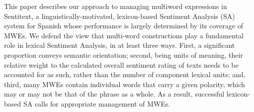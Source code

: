 This paper describes our approach to managing multiword expressions in Sentitext, a linguistically-motivated, lexicon-based Sentiment Analysis (SA)
 system for Spanish whose performance is largely determined by its coverage of
 MWEs. We defend the view that multi-word constructions play a fundamental role
 in lexical Sentiment Analysis, in at least three ways. First, a significant
 proportion conveys semantic orientation; second, being units of meaning, their
 relative weight to the calculated overall sentiment rating of texts needs to be
 accounted for as such, rather than the number of component lexical units; and,
 third, many MWEs contain individual words that carry a given polarity, which
 may or may not be that of the phrase as a whole. As a result, successful
 lexicon-based SA calls for appropriate management of MWEs.


